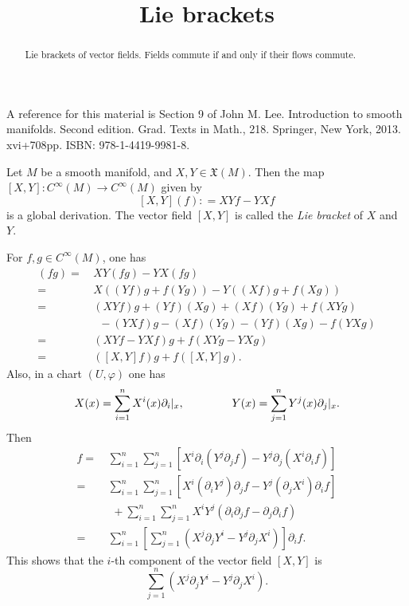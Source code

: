 \documentclass{ximera}
\title{Lie brackets}
\begin{document}
    \begin{abstract} Lie brackets of vector fields. Fields commute if and only if their flows commute.  \end{abstract}
    \maketitle

   A reference for this material is Section 9 of John M. Lee. Introduction to smooth manifolds. Second edition. Grad. Texts in Math., 218. Springer, New York, 2013. xvi+708pp. ISBN: 978-1-4419-9981-8.



    \begin{proposition}
        Let $M$ be a smooth manifold, and $X,Y \in \mathfrak{X}(M)$. Then the map $[X,Y] : C^{\infty} (M) \to C^{\infty}(M)$ given by 
        \[   [X,Y] (f) : = XY f - YXf   \]
        is a global derivation. The vector field $[X,Y]$ is called the \emph{Lie bracket} of $X$ and $Y$.  
    \begin{solution}
        For $f,g \in C^{\infty}(M)$, one has
        \begin{align*}
            [X,Y] (fg)  = & \,  XY(fg) - YX (fg) \\
            = & \, X( (Yf)g + f (Yg) ) - Y ( (Xf)g + f (Xg) ) \\
            = &  \, (XYf) g + (Yf )(Xg) + (Xf)(Yg) + f (XYg)\\
              & \, \,\,\, - (YXf)g - (Xf )(Yg) - (Yf)(Xg) - f (YX g) \\
            = &  \, (  XY f - YXf  ) g + f( XY g - YX g ) \\
            = & \, ( [X,Y] f) g + f ([X,Y] g) .
        \end{align*}
    Also, in a chart $(U, \varphi)$ one has 
    \[    X (x) = \sum _{i = 1} ^n X^i (x) \partial _i \vert _x , \hspace{1.5cm} Y (x) = \sum_{j = 1} ^n Y^j (x) \partial _j \vert _x .                                   \]
    Then
    \begin{align*}
        [X,Y] f =  & \,  \sum_{i = 1 } ^n \sum_{j = 1} ^n [  X^i \partial_i ( Y^j \partial _j f  )  - Y^j \partial_j ( X^i \partial_i f )  ]\\
         = & \,   \sum_{i = 1 } ^n \sum_{j = 1} ^n [  X^i (\partial_i Y^j) \partial_j f - Y^j (\partial_j X^i ) \partial_i f ] \\
        & \,\,\, + \sum_{i = 1 } ^n \sum_{j = 1} ^n  X^i Y^j (\partial_i \partial_j f - \partial _j \partial_i f)\\
        = & \, \sum_{i = 1} ^n \left[   \sum_{j = 1 }^n (  X^j \partial_j Y^i - Y^j \partial_j X^i ) \right] \partial_i f .
    \end{align*}
    This shows that the $i$-th component of the vector field $[X,Y]$ is 
    \[         \sum_{j = 1 }^n (  X^j \partial_j Y^i - Y^j \partial_j X^i )   .    \]
    \end{solution}
\end{proposition}
\end{document}

